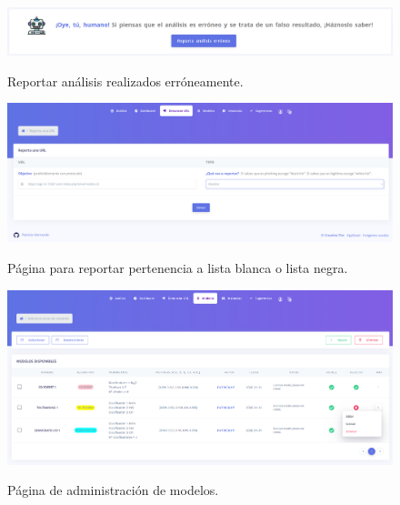 \begin{figure}[h]
	\caption[Manual de usuario: reportar análisis erróneo]{Reportar análisis realizados erróneamente.}
	\centering
	\includegraphics[width=\textwidth]{../img/anexos/user_guide/3_report_false_analysis}
	\label{e-3:report-false-analysis}
\end{figure}

\begin{figure}[h]
	\caption[Manual de usuario: reportar pertenencia a lista]{Página para reportar pertenencia a lista blanca o lista negra.}
	\centering
	\includegraphics[width=\textwidth]{../img/anexos/user_guide/4_report_url}
	\label{e-3:report-url}
\end{figure}

\begin{figure}[h]
	\caption[Manual de usuario: página de modelos]{Página de administración de modelos.}
	\centering
	\includegraphics[width=\textwidth]{../img/anexos/user_guide/5_models}
	\label{e-5:models}
\end{figure}

